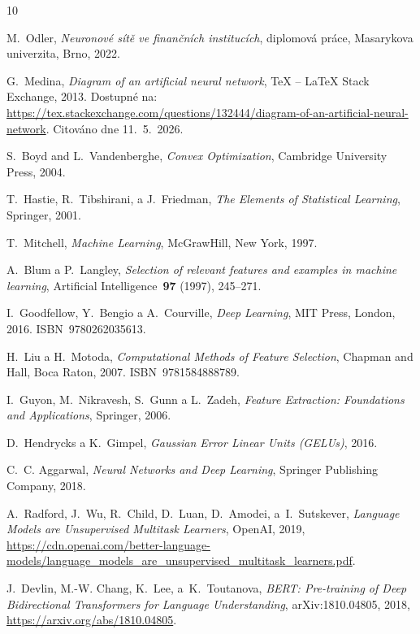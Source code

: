 \begin{thebibliography}{10}

M.~Odler, \textit{Neuronové sítě ve finančních institucích}, diplomová práce,
Masarykova univerzita, Brno, 2022.

G.~Medina, \textit{Diagram of an artificial neural network},
TeX -- LaTeX Stack Exchange, 2013.
Dostupné na:
\url{https://tex.stackexchange.com/questions/132444/diagram-of-an-artificial-neural-network}. 
Citováno dne 11.~5.~2026.

S.~Boyd and L.~Vandenberghe, \textit{Convex Optimization}, Cambridge University Press, 2004.

T.~Hastie, R.~Tibshirani, a J.~Friedman, \textit{The Elements of Statistical Learning}, Springer, 2001.

T.~Mitchell, \textit{Machine Learning}, McGraw\textendash Hill, New York, 1997.

A.~Blum a P.~Langley, \textit{Selection of relevant features and examples in
  machine learning}, Artificial Intelligence~\textbf{97} (1997), 245--271.

I.~Goodfellow, Y.~Bengio a A.~Courville, \textit{Deep Learning}, MIT Press, London, 2016. 
ISBN~9780262035613.

H.~Liu a H.~Motoda, \textit{Computational Methods of Feature Selection}, Chapman and Hall, 
Boca Raton, 2007. ISBN~9781584888789.

I.~Guyon, M.~Nikravesh, S.~Gunn a L.~Zadeh, \textit{Feature Extraction: Foundations and Applications}, Springer, 2006.

D.~Hendrycks a K.~Gimpel, \textit{Gaussian Error Linear Units (GELUs)}, 2016.

C.~C. Aggarwal, \textit{Neural Networks and Deep Learning}, Springer Publishing Company, 2018.

A.~Radford, J.~Wu, R.~Child, D.~Luan, D.~Amodei, a~I.~Sutskever, 
\textit{Language Models are Unsupervised Multitask Learners}, OpenAI, 2019, 
\url{https://cdn.openai.com/better-language-models/language_models_are_unsupervised_multitask_learners.pdf}.

J.~Devlin, M.-W. Chang, K.~Lee, a~K.~Toutanova, 
\textit{BERT: Pre-training of Deep Bidirectional Transformers for Language Understanding}, 
arXiv:1810.04805, 2018, 
\url{https://arxiv.org/abs/1810.04805}.



\end{thebibliography}
